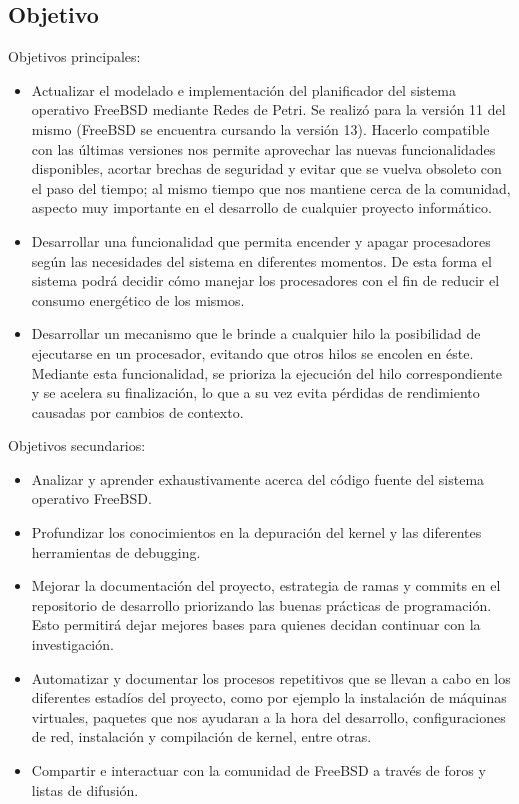 \subsection{Objetivo}

Objetivos principales:

\begin{itemize}
    \item Actualizar el modelado e implementación del planificador del sistema operativo FreeBSD mediante Redes de Petri. Se realizó para la versión 11 del mismo (FreeBSD se encuentra cursando la versión 13). Hacerlo compatible con las últimas versiones nos permite aprovechar las nuevas funcionalidades disponibles, acortar brechas de seguridad y evitar que se vuelva obsoleto con el paso del tiempo; al mismo tiempo que nos mantiene cerca de la comunidad, aspecto muy importante en el desarrollo de cualquier proyecto informático.
    \item Desarrollar una funcionalidad que permita encender y apagar procesadores según las necesidades del sistema en diferentes momentos. De esta forma el sistema podrá decidir cómo manejar los procesadores con el fin de reducir el consumo energético de los mismos.
    \item Desarrollar un mecanismo que le brinde a cualquier hilo la posibilidad de ejecutarse en un procesador, evitando que otros hilos se encolen en éste. Mediante esta funcionalidad, se prioriza la ejecución del hilo correspondiente y se acelera su finalización, lo que a su vez evita pérdidas de rendimiento causadas por cambios de contexto.
\end{itemize}

Objetivos secundarios:
\begin{itemize}
    \item Analizar y aprender exhaustivamente acerca del código fuente del sistema operativo FreeBSD.
    \item Profundizar los conocimientos en la depuración del kernel y las diferentes herramientas de debugging.
    \item Mejorar la documentación del proyecto, estrategia de ramas y commits en el repositorio de desarrollo priorizando las buenas prácticas de programación. Esto permitirá dejar mejores bases para quienes decidan continuar con la investigación.
    \item Automatizar y documentar los procesos repetitivos que se llevan a cabo en los diferentes estadíos del proyecto, como por ejemplo la instalación de máquinas virtuales, paquetes que nos ayudaran a la hora del desarrollo, configuraciones de red, instalación y compilación de kernel, entre otras.
    \item Compartir e interactuar con la comunidad de FreeBSD a través de foros y listas de difusión.
\end{itemize}

